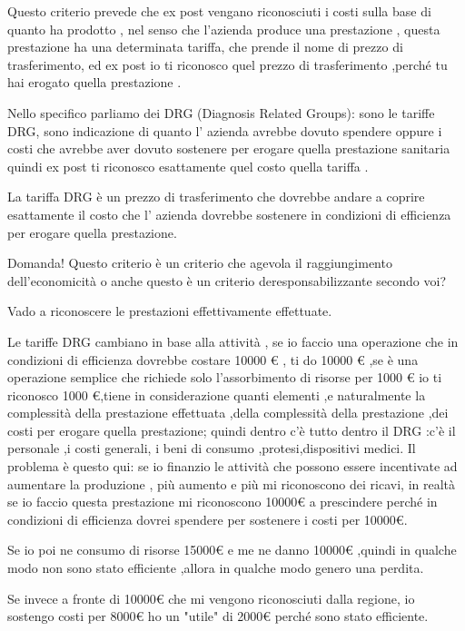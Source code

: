 Questo criterio prevede che ex post vengano riconosciuti i costi sulla
base di quanto ha prodotto , nel senso che l'azienda produce una
prestazione , questa prestazione ha una determinata tariffa, che prende
il nome di prezzo di trasferimento, ed ex post io ti riconosco quel
prezzo di trasferimento ,perché tu hai erogato quella prestazione .

Nello specifico parliamo dei DRG (Diagnosis Related Groups): sono le
tariffe DRG, sono indicazione di quanto l' azienda avrebbe dovuto
spendere oppure i costi che avrebbe aver dovuto sostenere per erogare
quella prestazione sanitaria quindi ex post ti riconosco esattamente
quel costo quella tariffa .

La tariffa DRG è un prezzo di trasferimento che dovrebbe andare a
coprire esattamente il costo che l' azienda dovrebbe sostenere in
condizioni di efficienza per erogare quella prestazione.

Domanda! Questo criterio è un criterio che agevola il raggiungimento
dell'economicità o anche questo è un criterio deresponsabilizzante
secondo voi?

Vado a riconoscere le prestazioni effettivamente effettuate.

Le tariffe DRG cambiano in base alla attività , se io faccio una
operazione che in condizioni di efficienza dovrebbe costare 10000
\euro{} , ti do 10000 \euro{} ,se è una operazione semplice che richiede
solo l'assorbimento di risorse per 1000 \euro{} io ti riconosco 1000
\euro{},tiene in considerazione quanti elementi ,e naturalmente la
complessità della prestazione effettuata ,della complessità della
prestazione ,dei costi per erogare quella prestazione; quindi dentro c'è
tutto dentro il DRG :c'è il personale ,i costi generali, i beni di
consumo ,protesi,dispositivi medici. Il problema è questo qui: se io
finanzio le attività che possono essere incentivate ad aumentare la
produzione , più aumento e più mi riconoscono dei ricavi, in realtà se
io faccio questa prestazione mi riconoscono 10000\euro{} a prescindere
perché in condizioni di efficienza dovrei spendere per sostenere i costi
per 10000\euro{}.

Se io poi ne consumo di risorse 15000\euro{} e me ne danno 10000\euro{}
,quindi in qualche modo non sono stato efficiente ,allora in qualche
modo genero una perdita.

Se invece a fronte di 10000\euro{} che mi vengono riconosciuti dalla
regione, io sostengo costi per 8000\euro{} ho un "utile" di 2000\euro{}
perché sono stato efficiente.

